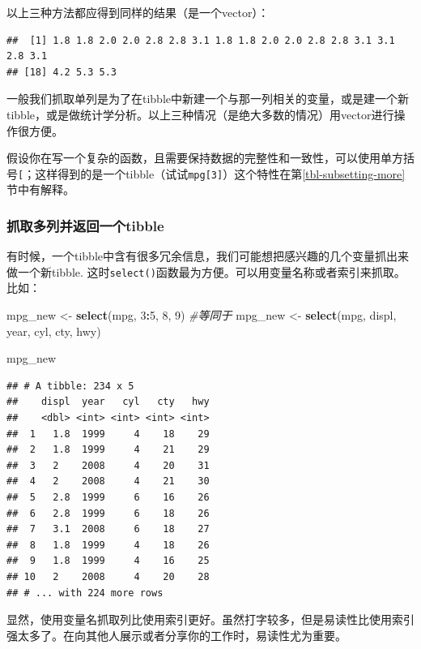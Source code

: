 \documentclass[]{book}
\newenvironment{Shaded}{\begin{snugshade}}{\end{snugshade}}
\newcommand{\CommentTok}[1]{\textcolor[rgb]{0.56,0.35,0.01}{\textit{#1}}}
\newcommand{\DecValTok}[1]{\textcolor[rgb]{0.00,0.00,0.81}{#1}}
\newcommand{\KeywordTok}[1]{\textcolor[rgb]{0.13,0.29,0.53}{\textbf{#1}}}
\newcommand{\NormalTok}[1]{#1}
\newcommand{\OperatorTok}[1]{\textcolor[rgb]{0.81,0.36,0.00}{\textbf{#1}}}
\newcommand{\StringTok}[1]{\textcolor[rgb]{0.31,0.60,0.02}{#1}}
\begin{document}
以上三种方法都应得到同样的结果（是一个vector）：

\begin{verbatim}
##  [1] 1.8 1.8 2.0 2.0 2.8 2.8 3.1 1.8 1.8 2.0 2.0 2.8 2.8 3.1 3.1 2.8 3.1
## [18] 4.2 5.3 5.3
\end{verbatim}

一般我们抓取单列是为了在tibble中新建一个与那一列相关的变量，或是建一个新tibble，或是做统计学分析。以上三种情况（是绝大多数的情况）用vector进行操作很方便。

假设你在写一个复杂的函数，且需要保持数据的完整性和一致性，可以使用单方括号\texttt{{[}}；这样得到的是一个tibble（试试\texttt{mpg{[}3{]}}）这个特性在第\ref{tbl-subsetting-more}节中有解释。

\hypertarget{tibble}{%
\subsubsection{抓取多列并返回一个tibble}\label{tibble}}

有时候，一个tibble中含有很多冗余信息，我们可能想把感兴趣的几个变量抓出来做一个新tibble. 这时\texttt{select()}函数最为方便。可以用变量名称或者索引来抓取。比如：

\begin{Shaded}
\begin{Highlighting}[]
\NormalTok{mpg_new <-}\StringTok{ }\KeywordTok{select}\NormalTok{(mpg, }\DecValTok{3}\OperatorTok{:}\DecValTok{5}\NormalTok{, }\DecValTok{8}\NormalTok{, }\DecValTok{9}\NormalTok{)}
\CommentTok{#等同于}
\NormalTok{mpg_new <-}\StringTok{ }\KeywordTok{select}\NormalTok{(mpg, displ, year, cyl, cty, hwy)}

\NormalTok{mpg_new}
\end{Highlighting}
\end{Shaded}

\begin{verbatim}
## # A tibble: 234 x 5
##    displ  year   cyl   cty   hwy
##    <dbl> <int> <int> <int> <int>
##  1   1.8  1999     4    18    29
##  2   1.8  1999     4    21    29
##  3   2    2008     4    20    31
##  4   2    2008     4    21    30
##  5   2.8  1999     6    16    26
##  6   2.8  1999     6    18    26
##  7   3.1  2008     6    18    27
##  8   1.8  1999     4    18    26
##  9   1.8  1999     4    16    25
## 10   2    2008     4    20    28
## # ... with 224 more rows
\end{verbatim}

显然，使用变量名抓取列比使用索引更好。虽然打字较多，但是易读性比使用索引强太多了。在向其他人展示或者分享你的工作时，易读性尤为重要。
\end{document}
